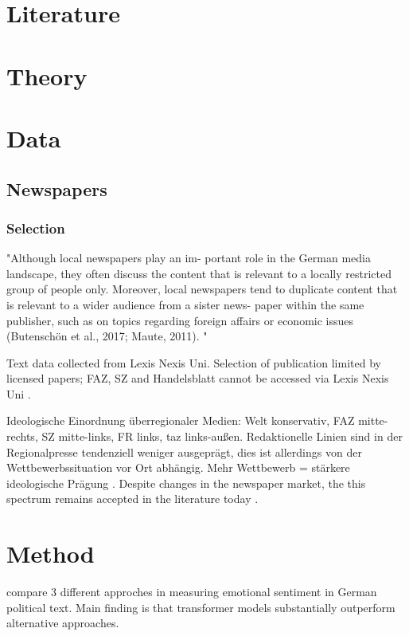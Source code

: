 \documentclass[12pt,oneside,a4paper]{article}
\begin{document}
\section{Literature}
%

\section{Theory}
%

\section{Data}
%
\subsection{Newspapers}
\subsubsection{Selection}
"Although local newspapers play an im-
portant role in the German media landscape, they often discuss the content that is
relevant to a locally restricted group of people only. Moreover, local newspapers tend to duplicate content that is relevant to a wider audience from a sister news-
paper within the same publisher, such as on topics regarding foreign affairs or
economic issues (Butenschön et al., 2017; Maute, 2011). " \parencite{Falck2019}

Text data collected from Lexis Nexis Uni. Selection of publication limited by licensed papers; FAZ, SZ and Handelsblatt cannot be accessed via Lexis Nexis Uni \parencite{LexisNexis2023}.

Ideologische Einordnung überregionaler Medien: Welt konservativ, FAZ mitte-rechts, SZ mitte-links, FR links, taz links-außen. Redaktionelle Linien sind in der Regionalpresse tendenziell weniger ausgeprägt, dies ist allerdings von der Wettbewerbssituation vor Ort abhängig. Mehr Wettbewerb = stärkere ideologische Prägung \parencite[pp. 129-130]{Maurer2006}. Despite changes in the newspaper market, the this spectrum remains accepted in the literature today \parencite[pp. 59-60]{Merkle2019}.

\section{Method}
\cite{Widmann2022} compare 3 different approches in measuring emotional sentiment in German political text. Main finding is that transformer models substantially outperform alternative approaches.
\end{document}
